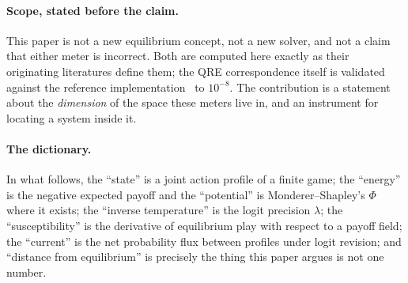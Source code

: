 \paragraph{Scope, stated before the claim.} This paper is not a new equilibrium concept,
not a new solver, and not a claim that either meter is incorrect. Both are computed here
exactly as their originating literatures define them; the QRE correspondence itself is
validated against the reference implementation~\cite{gambit} to $10^{-8}$. The contribution
is a statement about the \emph{dimension} of the space these meters live in, and an
instrument for locating a system inside it.

\paragraph{The dictionary.} In what follows, the ``state'' is a joint action profile of a
finite game; the ``energy'' is the negative expected payoff and the ``potential'' is
Monderer--Shapley's $\Phi$ where it exists; the ``inverse temperature'' is the logit
precision $\lambda$; the ``susceptibility'' is the derivative of equilibrium play with
respect to a payoff field; the ``current'' is the net probability flux between profiles
under logit revision; and ``distance from equilibrium'' is precisely the thing this paper
argues is not one number.

